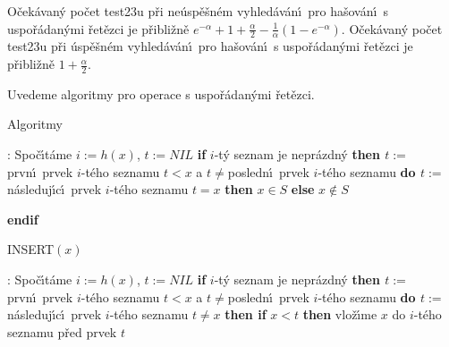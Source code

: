 O\v cek\'avan\'y po\v cet test\accent23u p\v ri 
ne\'usp\v e\v sn\'em vyhled\'av\'an\'\i\ pro ha\v sov\'an\'\i\ s uspo\v r\'a\-dan\'ymi 
\v ret\v ezci je p\v ribli\v zn\v e $e^{-\alpha}+1+\frac {\alpha}
2-\frac 1{\alpha}(1-e^{-\alpha})$. O\v cek\'avan\'y 
po\v cet test\accent23u p\v ri \'usp\v e\v sn\'em vyhled\'av\'an\'\i\ pro 
ha\v sov\'an\'\i\ s uspo\v r\'adan\'ymi \v ret\v ezci je 
p\v ribli\v zn\v e $1+\frac {\alpha}2.$
\endproclaim

\flushpar Uvedeme algoritmy pro operace s uspo\v r\'adan\'ymi 
\v re\-t\v ez\-ci.
\medskip

\subhead
Algoritmy
\endsubhead
\smallskip

:\newline 
Spo\v c\'\i t\'ame $i:=h(x)$, $t:=NIL$\newline 
{\bf if} $i$-t\'y seznam je nepr\'azdn\'y {\bf then\newline 
\phantom{{\rm ---}}$t:=$}prvn\'\i\ prvek $i$-t\'eho seznamu\newline 
\phantom{---}{\bf while} $t<x$ a $t\ne$posledn\'\i\ prvek $i$-t\'eho seznamu {\bf do\newline 
\phantom{{\rm ------}}$t:=$}n\'asleduj\'\i c\'\i\ prvek $i$-t\'eho seznamu\newline
\phantom{---}{\bf enddo\newline 
endif \newline 
if} $t=x$ {\bf then} $x\in S$ {\bf else} $x\notin S$ {\bf endif
\medskip

\flushpar INSERT$(x)$}:\newline 
Spo\v c\'\i t\'ame $i:=h(x)$, $t:=NIL$\newline 
{\bf if} $i$-t\'y seznam je nepr\'azdn\'y {\bf then\newline 
\phantom{{\rm ---}}$t:=$}prvn\'\i\ prvek $i$-t\'eho seznamu\newline 
\phantom{---}{\bf while} $t<x$ a $t\ne$posledn\'\i\ prvek $i$-t\'eho seznamu {\bf do\newline 
\phantom{{\rm ------}}$t:=$}n\'asleduj\'\i c\'\i\ prvek $i$-t\'eho seznamu\newline 
\phantom{---}{\bf enddo\newline 
endif \newline 
if} $t\ne x$ {\bf then\newline 
\phantom{{\rm ---}}if} $x<t$ {\bf then\newline 
\phantom{{\rm ------}}}vlo\v z\'\i me $x$ do $i$-t\'eho seznamu p\v red prvek $
t$\newline 
